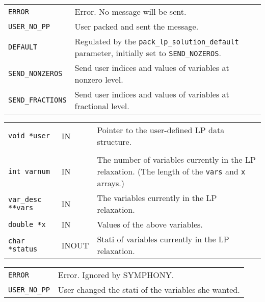 \documentclass[twoside,11pt]{article}
\begin{document}
{\newpage
\clearpage
\samepage \begin{tabular}{lp{315pt}}
{\tt ERROR} & Error. No message will be sent. \\ 
{\tt USER\_NO\_PP} & User packed and sent the message. \\ 
{\tt DEFAULT} & Regulated by the {\tt pack\_lp\_solution\_default}
parameter, initially set to {\tt SEND\_NOZEROS}. \\ 
{\tt SEND\_NONZEROS} & Send user indices and values of variables
at nonzero level.\\ 
{\tt SEND\_FRACTIONS} & Send user indices and values of variables
at fractional level.\\ 
\end{tabular}
}

{\newpage
\clearpage
\samepage \begin{tabular}{llp{260pt}}
{\tt void *user} &  IN & Pointer to the user-defined LP data structure. \\ 
& & \\ 
{\tt int varnum} & IN & The number of variables currently in the LP
relaxation. (The length of the {\tt *vars} and {\tt x} arrays.) \\ 
{\tt var\_desc **vars} & IN & The variables currently in the LP relaxation.\\ 
{\tt double *x} & IN & Values of the above variables.\\ 
{\tt char *status} & INOUT & Stati of variables currently in the LP
relaxation. \\ 
\end{tabular}
}

{\newpage
\clearpage
\samepage \begin{tabular}{lp{300pt}}
{\tt ERROR} & Error. Ignored by {\sc SYMPHONY}. \\ 
{\tt USER\_NO\_PP} & User changed the stati of the variables she
wanted. \\ 
\end{tabular}
}
\end{document}
